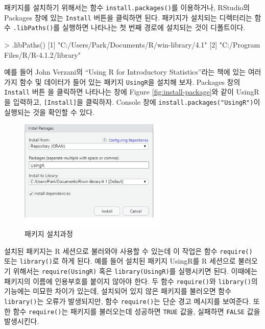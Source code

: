 \documentclass[
]{book}
\newenvironment{Shaded}{\begin{snugshade}}{\end{snugshade}}
\newcommand{\DecValTok}[1]{\textcolor[rgb]{0.00,0.00,0.81}{#1}}
\newcommand{\FunctionTok}[1]{\textcolor[rgb]{0.00,0.00,0.00}{#1}}
\newcommand{\NormalTok}[1]{#1}
\newcommand{\SpecialCharTok}[1]{\textcolor[rgb]{0.00,0.00,0.00}{#1}}
\newcommand{\StringTok}[1]{\textcolor[rgb]{0.31,0.60,0.02}{#1}}
\begin{document}
패키지를 설치하기 위해서는 함수 \texttt{install.packages()}를 이용하거나,
RStudio의 Packages 창에 있는 \texttt{Install} 버튼을 클릭하면 된다. 패키지가
설치되는 디렉터리는 함수 \texttt{.libPaths()}를 실행하면 나타나는 첫 번째
경로에 설치되는 것이 디폴트이다.

\begin{Shaded}
\begin{Highlighting}[]
\SpecialCharTok{\textgreater{}} \FunctionTok{.libPaths}\NormalTok{()}
\NormalTok{[}\DecValTok{1}\NormalTok{] }\StringTok{"C:/Users/Park/Documents/R/win{-}library/4.1"}
\NormalTok{[}\DecValTok{2}\NormalTok{] }\StringTok{"C:/Program Files/R/R{-}4.1.2/library"}       
\end{Highlighting}
\end{Shaded}

예를 들어 John Verzani의 ``Using R for Introductory Statistics''라는 책에
있는 여러 가지 함수 및 데이터가 들어 있는 패키지 \texttt{UsingR}을 설치해 보자.
Packages 창의 \texttt{Install} 버튼 을 클릭하면 나타나는 창에 Figure
\ref{fig:install-package}와 같이 UsingR을 입력하고, \texttt{{[}Install{]}}을
클릭하자. Console 창에 \texttt{install.packages("UsingR")}이 실행되는 것을
확인할 수 있다.

\begin{figure}
\hypertarget{install-package}{%
\centering
\includegraphics[width=2.77083in,height=\textheight]{Figure/install_package.png}
\caption{패키지
설치과정}\label{install-package}
}
\end{figure}

설치된 패키지는 R 세션으로 불러와야 사용할 수 있는데 이 작업은 함수
\texttt{require()} 또는 \texttt{library()}로 하게 된다. 예를 들어 설치된 패키지
UsingR를 R 세션으로 불러오기 위해서는 \texttt{require(UsingR)} 혹은
\texttt{library(UsingR)}를 실행시키면 된다. 이때에는 패키지의 이름에 인용부호를
붙이지 않아야 한다. 두 함수 \texttt{require()}와 \texttt{library()}의 기능에는 미묘한
차이가 있는데, 설치되어 있지 않은 패키지를 불러오면 함수 \texttt{library()}는
오류가 발생되지만, 함수 \texttt{require()}는 단순 경고 메시지를 보여준다. 또한
함수 \texttt{require()}는 패키지를 불러오는데 성공하면 \texttt{TRUE} 값을, 실패하면
\texttt{FALSE} 값을 발생시킨다.
\end{document}
